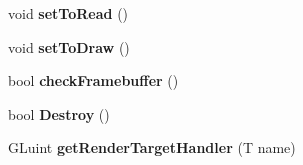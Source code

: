 \begin{DoxyCompactItemize}
\item 
void {\bfseries set\+To\+Read} ()\hypertarget{class_frame_buffer_aab0e90a873662766c8aeb7d034bf981c}{}\label{class_frame_buffer_aab0e90a873662766c8aeb7d034bf981c}

\item 
void {\bfseries set\+To\+Draw} ()\hypertarget{class_frame_buffer_a7fc09c39eb24e6cadc57b006dd6af0cc}{}\label{class_frame_buffer_a7fc09c39eb24e6cadc57b006dd6af0cc}

\item 
bool {\bfseries check\+Framebuffer} ()\hypertarget{class_frame_buffer_a76d5ef51d24805dd4c2de33dcc598b75}{}\label{class_frame_buffer_a76d5ef51d24805dd4c2de33dcc598b75}

\item 
bool {\bfseries Destroy} ()\hypertarget{class_frame_buffer_afedd4359e85b3588fa11656b9dbade69}{}\label{class_frame_buffer_afedd4359e85b3588fa11656b9dbade69}

\item 
G\+Luint {\bfseries get\+Render\+Target\+Handler} (T name)\hypertarget{class_frame_buffer_aa66d88e11d16a6e505878acca41f872c}{}\label{class_frame_buffer_aa66d88e11d16a6e505878acca41f872c}

\end{DoxyCompactItemize}
